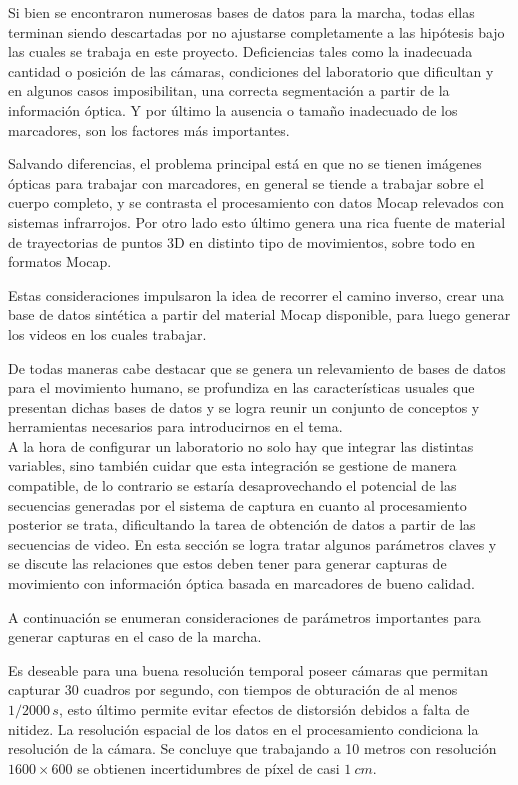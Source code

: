 Si bien se encontraron numerosas bases de datos para la marcha, todas ellas terminan siendo descartadas por no ajustarse completamente a las hipótesis bajo las cuales se trabaja en este proyecto. Deficiencias tales como la inadecuada cantidad o posición de las cámaras, condiciones del laboratorio que dificultan y en algunos casos imposibilitan, una correcta segmentación a partir de la información óptica. Y por último la ausencia o tamaño inadecuado de los marcadores, son los factores más importantes.


Salvando diferencias, el problema principal está en que no se tienen imágenes ópticas para trabajar con marcadores, en general se tiende a trabajar sobre el cuerpo completo, y se contrasta el procesamiento con datos Mocap relevados con sistemas infrarrojos. Por otro lado esto último genera una rica fuente de material de trayectorias de puntos 3D en distinto tipo de movimientos, sobre todo en formatos Mocap.



Estas consideraciones impulsaron la idea de recorrer el camino inverso, crear una base de datos sintética a partir del material Mocap disponible, para luego generar los videos en los cuales trabajar.  


De todas maneras cabe destacar que se genera un relevamiento de bases de datos para el movimiento humano, se profundiza en las características usuales que presentan dichas bases de datos y se logra reunir un conjunto de conceptos y herramientas necesarios para introducirnos en el tema. \\



A la hora de configurar un laboratorio no solo hay que integrar las distintas variables, sino también cuidar que esta integración se gestione de manera compatible, de lo contrario se estaría desaprovechando el potencial de las secuencias generadas por el sistema de captura en cuanto al procesamiento posterior se trata, dificultando la tarea de obtención de datos a partir de las secuencias de video.
En esta sección se logra tratar algunos parámetros claves y se discute las relaciones que estos deben tener para generar capturas de movimiento con información óptica basada en marcadores de bueno calidad.


A continuación se enumeran consideraciones de parámetros importantes para generar capturas en el caso de la marcha.

Es deseable para una buena resolución temporal poseer cámaras que permitan capturar 30 cuadros por segundo, con tiempos de obturación de al menos $1/2000\, s$, esto último permite evitar efectos de distorsión debidos a falta de nitidez. La resolución espacial de los datos en el procesamiento condiciona la resolución de la cámara. Se concluye que trabajando a 10 metros con resolución $1600\times600$ se obtienen incertidumbres de píxel de casi $1 ~cm $. 


